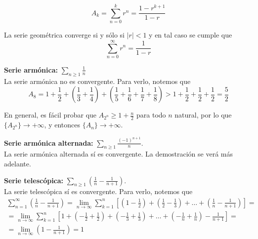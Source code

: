 \begin{equation*}
    A_k = \displaystyle\sum_{n = 0}^{k} r^n = \frac{1-r^{k+1}}{1-r}
\end{equation*}

La serie geométrica converge si y sólo si $|r| < 1$ y en tal caso se cumple que
\begin{equation*}
    \sum_{n = 0}^{\infty} r^n = \frac{1}{1-r}
\end{equation*}

\newpage
\vspace{0.5cm}\noindent\textbf{Serie armónica:}
$\displaystyle \sum_{n \geq 1} \frac{1}{n}$\\

La serie armónica no es convergente. Para verlo, notemos que
\begin{equation*}
    A_8 = 1+\frac{1}{2}+\left(\frac{1}{3}+\frac{1}{4}\right)+\left(\frac{1}{5}+\frac{1}{6}+\frac{1}{7}+\frac{1}{8}\right) > 1+\frac{1}{2}+\frac{1}{2}+\frac{1}{2} = \frac{5}{2}
\end{equation*}

En general, es fácil probar que $A_{2^n} \geq 1 + \frac{n}{2}$ para todo $n$ natural, por lo que
$\{A_{2^n}\} \longrightarrow +\infty$, y entonces $\{A_n\} \longrightarrow +\infty$.

\vspace{0.5cm}\noindent\textbf{Serie armónica alternada:} $\displaystyle\sum_{n \geq 1} \frac{(-1)^{n+1}}{n}$.\\

La serie armónica alternada sí es convergente. La demostración se verá más adelante.

\vspace{0.5cm}\noindent\textbf{Serie telescópica:} $\displaystyle\sum_{n \geq 1} \left(\frac{1}{n} - \frac{1}{n+1}\right)$.\\

La serie telescópica sí es convergente. Para verlo, notemos que
\begin{multline*}
    \displaystyle\sum_{n = 1}^{\infty} \left(\frac{1}{n} - \frac{1}{n+1}\right) = \lim_{n \to \infty} \displaystyle\sum_{k = 1}^{n} \left[ \left(1 - \frac{1}{2}\right) + \left(\frac{1}{2} - \frac{1}{3}\right) + \dots + \left(\frac{1}{n} - \frac{1}{n+1}\right)\right]=\\
    = \lim_{n \to \infty} \displaystyle\sum_{k = 1}^{n} \left[ 1 + \left(-\frac{1}{2} + \frac{1}{2}\right) + \left(-\frac{1}{3} + \frac{1}{3}\right) + \dots + \left(-\frac{1}{n} + \frac{1}{n}\right) - \frac{1}{n+1}\right] =\\
    =\lim_{n \to \infty} \left( 1- \frac{1}{n+1} \right) = 1
\end{multline*}

